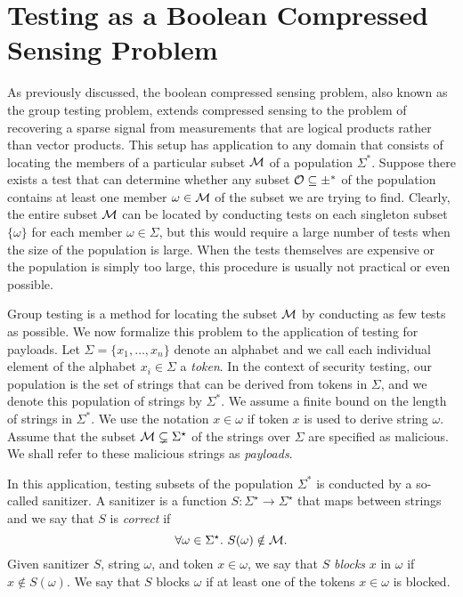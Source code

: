 \section{Testing as a Boolean Compressed Sensing Problem}
As previously discussed, the boolean compressed sensing problem, also known as the group testing problem, extends compressed sensing to the problem of recovering a sparse signal from measurements that are logical products rather than vector products. This setup has application to any domain that consists of locating the members of a particular subset $\cal{M}$ of a population $\Sigma^*$. Suppose there exists a test that can determine whether any subset $\cal{O}\subseteq\Sigma^*$ of the population contains at least one member $\omega\in\cal{M}$ of the subset we are trying to find. Clearly, the entire subset $\cal{M}$ can be located by conducting tests on each singleton subset $\{\omega\}$ for each member $\omega\in\Sigma$, but this would require a large number of tests when the size of the population is large.  When the tests themselves are expensive or the population is simply too large, this procedure is usually not practical or even possible.  

Group testing is a method for locating the subset $\cal{M}$ by conducting as few tests as possible. We now formalize this problem to the application of testing for payloads. Let $\Sigma=\{ x_1,\ldots,x_n \}$ denote an alphabet and we call each individual element of the alphabet $x_i\in\Sigma$ a \emph{token}. In the context of security testing, our population is the set of strings that can be derived from tokens in $\Sigma$, and we denote this population of strings by $\Sigma^*$. We assume a finite bound on the length of strings in $\Sigma^*$. We use the notation $x\in\omega$ if token $x$ is used to derive string $\omega$. Assume that the subset ${\cal M} \subsetneq \Sigma^{\star}$ of the strings over $\Sigma$ are specified as malicious. We shall refer to these malicious strings as \emph{payloads}. 

In this application, testing subsets of the population $\Sigma^*$ is conducted by a so-called sanitizer. A sanitizer is a function 
$S \colon \Sigma^{\star} \rightarrow \Sigma^{\star}$ that maps between strings and we say that $S$ is \emph{correct} if
$$
\forall \omega \in \Sigma^{\star}.\ S(\omega) \notin {\cal M}.
$$ 
Given sanitizer $S$, string $\omega$, and token $x \in \omega$, we say that $S$ \emph{blocks} $x$ in $\omega$ if $x \notin S(\omega)$. We say that $S$ blocks $\omega$ if at least one of the tokens $x \in \omega$ is blocked.

